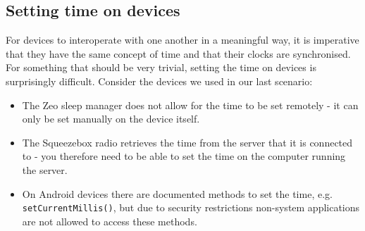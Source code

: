 






\subsection{Setting time on devices}

For devices to interoperate with one another in a meaningful way, it is imperative that they have the same concept of time and that their clocks are synchronised. For something that should be very trivial, setting the time on devices is surprisingly difficult. Consider the devices we used in our last scenario:

\begin{itemize}
	\item The Zeo sleep manager does not allow for the time to be set remotely - it can only be set manually on the device itself.
	\item The Squeezebox radio retrieves the time from the server that it is connected to - you therefore need to be able to set the time on the computer running the server.
	\item On Android devices there are documented methods to set the time, e.g. \texttt{setCurrentMillis()}, but due to security restrictions non-system applications are not allowed to access these methods.
\end{itemize}


